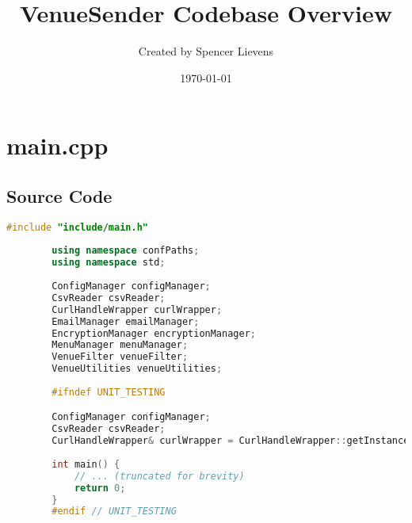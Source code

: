 \documentclass{article}
\title{VenueSender Codebase Overview}
\author{Created by Spencer Lievens}
\date{\today}
\begin{document}
	
	\maketitle
	\tableofcontents
	\newpage
	
	\section{main.cpp}
	
	\subsection*{Source Code}
	\begin{mdframed}[backgroundcolor=background, hidealllines=false, innerleftmargin=15pt, innerrightmargin=5pt, innertopmargin=0pt, innerbottommargin=-5pt]
	\begin{lstlisting}[language=C++]
		#include "include/main.h"
		
		using namespace confPaths;
		using namespace std;
		
		ConfigManager configManager;
		CsvReader csvReader;
		CurlHandleWrapper curlWrapper;
		EmailManager emailManager;
		EncryptionManager encryptionManager;
		MenuManager menuManager;
		VenueFilter venueFilter;
		VenueUtilities venueUtilities;
		
		#ifndef UNIT_TESTING

		ConfigManager configManager;
		CsvReader csvReader;
		CurlHandleWrapper& curlWrapper = CurlHandleWrapper::getInstance();
		
		int main() {
			// ... (truncated for brevity)
			return 0;
		}
		#endif // UNIT_TESTING
	\end{lstlisting}
\end{mdframed}
	
\end{document}
